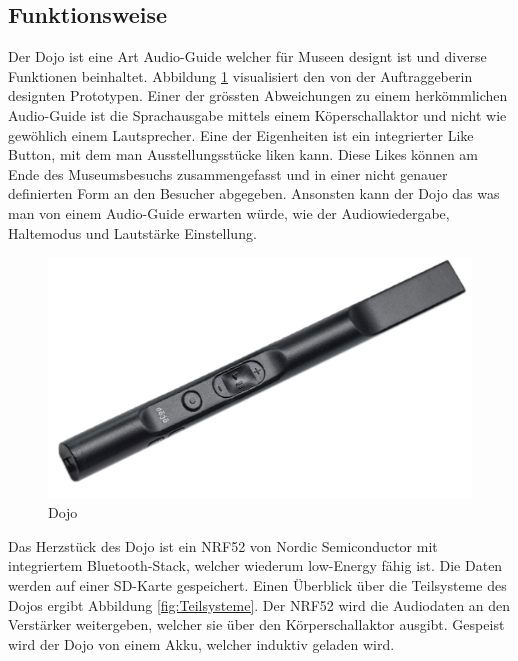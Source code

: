 \subsection{Funktionsweise} \label{sec:funktionsweise}

Der Dojo ist eine Art Audio-Guide welcher für Museen designt ist und diverse Funktionen beinhaltet. Abbildung \ref{fig:Funktion Dojo} visualisiert den von der Auftraggeberin designten Prototypen. Einer der grössten Abweichungen zu einem herkömmlichen Audio-Guide ist die Sprachausgabe mittels einem Köperschallaktor und nicht wie gewöhlich einem Lautsprecher. Eine der Eigenheiten ist ein integrierter Like Button, mit dem man Ausstellungsstücke \glqq liken \grqq kann. Diese Likes können am Ende des Museumsbesuchs zusammengefasst und in einer nicht genauer definierten Form an den Besucher abgegeben. Ansonsten kann der Dojo das was man von einem Audio-Guide erwarten würde, wie der Audiowiedergabe, Haltemodus und Lautstärke Einstellung.

\begin{figure}[H]
	\begin{center}
		\includegraphics[width=140mm]{data/Dojo.png}
		\caption[Dojo]{Dojo} %
		\label{fig:Funktion Dojo}
	\end{center}
\end{figure}

Das Herzstück des Dojo ist ein NRF52 von Nordic Semiconductor mit integriertem Bluetooth-Stack, welcher wiederum low-Energy fähig ist. Die Daten werden auf einer SD-Karte gespeichert. Einen Überblick über die Teilsysteme des Dojos ergibt Abbildung \ref{fig:Teilsysteme}. Der NRF52 wird die Audiodaten an den Verstärker weitergeben, welcher sie über den Körperschallaktor ausgibt. Gespeist wird der Dojo von einem Akku, welcher induktiv geladen wird.

